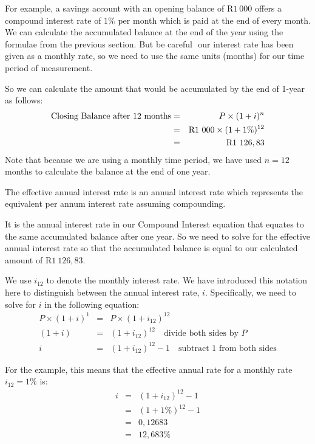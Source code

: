 For example, a savings account with an opening balance of R$1~000$ offers a compound interest rate of $1\%$ per month which is paid at the end of every month. We can calculate the accumulated balance at the end of the year using the formulae from the previous section. But be careful  our interest rate has been given as a monthly rate, so we need to use the same units (months) for our time period of measurement.


So we can calculate the amount that would be accumulated by the end of 1-year as follows:
\begin{eqnarray*}
\mbox{Closing Balance after 12 months}&=& P \times (1 + i)^n \\
&=& \rm{R}1~000 \times (1 + 1\%)^{12} \\
&=& \rm{R}1~126,83
\end{eqnarray*}
Note that because we are using a monthly time period, we have used $n=12$ months to calculate the balance at the end of one year.

The effective annual interest rate is an annual interest rate which represents the equivalent per annum interest rate assuming compounding.

It is the annual interest rate in our Compound Interest equation that equates to the same accumulated balance after one year. So we need to solve for the effective annual interest rate so that the accumulated balance is equal to our calculated amount of R$1~126,83$.

We use $i_{12}$ to denote the monthly interest rate. We have introduced this notation here to distinguish between the annual interest rate, $i$. Specifically, we need to solve for $i$ in the following equation:
\begin{eqnarray*}
P\times (1 + i) ^1 &=& P\times (1 + i_{12})^{12}\\
(1 + i) &=& (1 + i_{12})^{12}\quad\mbox{divide both sides by $P$}\\
i &=& (1 + i_{12})^{12}-1\quad\mbox{subtract $1$ from both sides}
\end{eqnarray*}

For the example, this means that the effective annual rate for a monthly rate $i_{12}=1\%$ is:
\begin{eqnarray*}
i &=& (1 + i_{12})^{12}-1\\
&=& (1 + 1\%)^{12}-1\\
&=&0,12683\\
&=&12,683\%
\end{eqnarray*}

